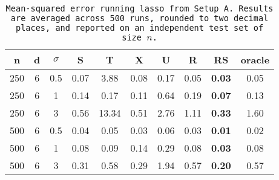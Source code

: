 \begin{table}[ht]
\centering
\begin{tabular}{cccccccccc}
  \hline
n & d & $\sigma$ & S & T & X & U & R & RS & oracle \\ 
  \hline
250 & 6 & 0.5 & 0.07 &  3.88 & 0.08 &  0.17 & 0.05 & \bf 0.03 & 0.05 \\ 
  250 & 6 & 1 & 0.14 &  0.17 & 0.11 &  0.64 & 0.19 & \bf 0.07 & 0.13 \\ 
  250 & 6 & 3 & 0.56 & 13.34 & 0.51 &  2.76 & 1.11 & \bf 0.33 & 1.60 \\ 
  500 & 6 & 0.5 & 0.04 &  0.05 & 0.03 &  0.06 & 0.03 & \bf 0.01 & 0.02 \\ 
  500 & 6 & 1 & 0.08 &  0.09 & 0.14 &  0.29 & 0.08 & \bf 0.03 & 0.08 \\ 
  500 & 6 & 3 & 0.31 &  0.58 & 0.29 &  1.94 & 0.57 & \bf 0.20 & 0.57 \\ 
   \hline
\end{tabular}
\caption{\tt Mean-squared error running \texttt{lasso} from Setup A. Results are averaged across 500 runs, rounded to two decimal places, and reported on an independent test set of size $n$.} 
\label{table:setup1}
\end{table}

